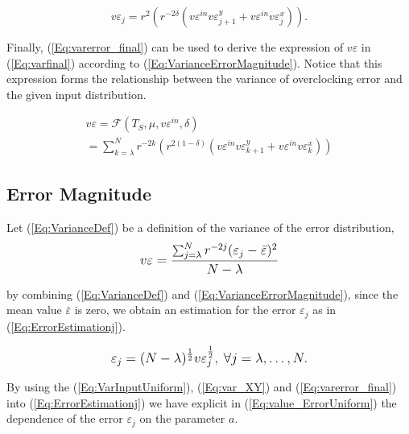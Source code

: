 \documentclass[journal]{IEEEtran}
\begin{document}
\begin{equation}\label{Eq:varerror_final}
v\varepsilon_j=r^2 \left( r^{-2\delta} \left( v\varepsilon^{in}  v\varepsilon^y_{j+1} +v\varepsilon^{in}  v\varepsilon^x_j \right) \right).
\end{equation}

Finally, (\ref{Eq:varerror_final}) can be used to derive the expression of $v\varepsilon$ in (\ref{Eq:varfinal}) according to (\ref{Eq:VarianceErrorMagnitude}). Notice that this expression forms the relationship between the variance of overclocking error and the given input distribution.

\begin{equation}\label{Eq:varfinal}
\begin{array}{l}
v\varepsilon =  \mathcal{F}(T_S, \mu, v\varepsilon^{in}, \delta)\\
=\sum_{k=\lambda}^{N}r^{-2k} \left( r^{2(1-\delta)} \left(v\varepsilon^{in}    v\varepsilon^y_{k+1} +v\varepsilon^{in}   v\varepsilon^x_k\right)\right)
\end{array}
\end{equation}



\subsection{Error Magnitude}\label{subsection:ErroeMagnitude} 

Let (\ref{Eq:VarianceDef}) be a definition of the variance of the error distribution, 
\begin{eqnarray}\label{Eq:VarianceDef}
\scriptsize
	v\varepsilon=\frac{\sum_{j=\lambda}^{N} r^{-2j}(\varepsilon_j-\bar{\varepsilon})^2}{N-\lambda}
\normalsize
\end{eqnarray}

by combining (\ref{Eq:VarianceDef}) and (\ref{Eq:VarianceErrorMagnitude}), since the mean value $\bar{\varepsilon}$ is zero, we obtain an estimation for the error $\varepsilon_j$ as in (\ref{Eq:ErrorEstimationj}).

\begin{eqnarray}\label{Eq:ErrorEstimationj}
\scriptsize
	\varepsilon_j=(N-\lambda)^{\frac{1}{2}} v\varepsilon_j^{\frac{1}{2}}, \ \forall j=\lambda,\dots,N.
\normalsize
\end{eqnarray}


By using the (\ref{Eq:VarInputUniform}), (\ref{Eq:var_XY}) and  (\ref{Eq:varerror_final}) into (\ref{Eq:ErrorEstimationj}) we have explicit in (\ref{Eq:value_ErrorUniform}) the dependence of the error $\varepsilon_j$ on the parameter $a$.
\end{document}
